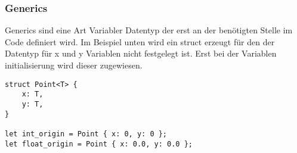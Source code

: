 \subsubsection{Generics}

Generics sind eine Art Variabler Datentyp der erst an der benötigten Stelle im Code definiert wird. Im Beispiel unten wird ein struct erzeugt für den der Datentyp für x und y Variablen nicht festgelegt ist. Erst bei der Variablen initialisierung wird dieser zugewiesen.


\begin{lstlisting}
struct Point<T> {
	x: T,
	y: T,
}

let int_origin = Point { x: 0, y: 0 };
let float_origin = Point { x: 0.0, y: 0.0 };
\end{lstlisting}